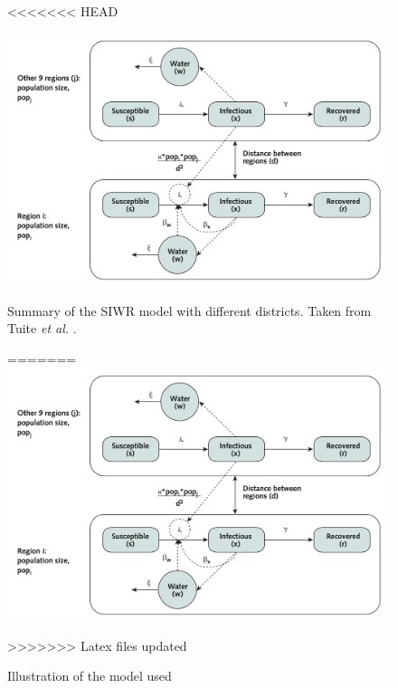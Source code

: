 \documentclass[11pt]{article}
\begin{document}
\begin{figure}
\begin{center}

<<<<<<< HEAD

\includegraphics[scale=1]{Bilder/figure_model_haiti.png}
\caption{Summary of the SIWR model with different districts. Taken from Tuite \textit{et al.} \cite{tuite:2011}.}
=======
\includegraphics[scale=.7]{Bilder/figure_model_haiti.png}
\caption{Illustration of the model used}
>>>>>>> Latex files updated
\label{pic:model_departments}
\end{center}
\end{figure}
\end{document}
